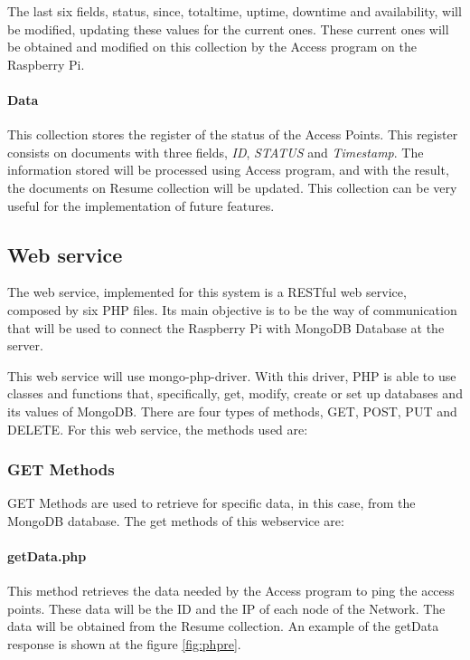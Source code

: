 \documentclass[12pt, a4paper,twoside]{tesi_upf}
\begin{document}
            The last six fields, status, since, totaltime, uptime, downtime and availability, will be modified, updating these values for the current ones. These current ones will be obtained and modified on this collection by the Access program on the Raspberry Pi.
            
            \paragraph{Data}
            
            This collection stores the register of the status of the Access Points. This register consists on documents with three fields, \textit{ID}, \textit{STATUS} and \textit{Timestamp}. 
            The information stored will be processed using Access program, and with the result, the documents on Resume collection will be updated.
            This collection can be very useful for the implementation of future features.
        
        \subsection{Web service}
        \label{web service}
        The web service, implemented for this system is a RESTful web service, composed by six PHP files. Its main objective is to be the way of communication that will be used to connect the Raspberry Pi with MongoDB Database at the server. 
        
        This web service will use mongo-php-driver. With this driver, PHP is able to use classes and functions that, specifically, get, modify, create or set up databases and its values of MongoDB. There are four types of methods, GET, POST, PUT and DELETE. For this web service, the methods used are:
            \subsubsection{GET Methods}
            GET Methods are used to retrieve for specific data, in this case, from the MongoDB database. The get methods of this webservice are:
                \paragraph{getData.php}
                This method retrieves the data needed by the Access program to ping the access points. These data will be the ID and the IP of each node of the Network. The data will be obtained from the Resume collection. An example of the getData response is shown at the figure \ref{fig:phpre}.
                
\end{document}
